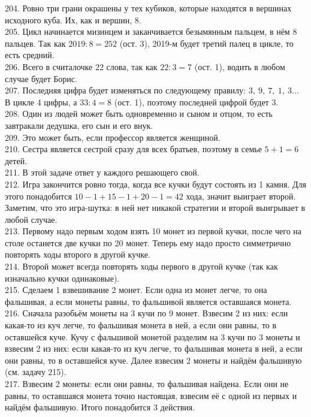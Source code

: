 \documentclass[12pt]{article}
\begin{document}
204. Ровно три грани окрашены у тех кубиков, которые находятся в вершинах исходного куба. Их, как и вершин, 8.\\
205. Цикл начинается мизинцем и заканчивается безымянным пальцем, в нём 8 пальцев. Так как $2019:8=252$ (ост. 3), 2019-м будет третий палец в цикле, то есть средний.\\
206. Всего в считалочке 22 слова, так как $22:3=7$ (ост. 1), водить в любом случае будет Борис.\\
207. Последняя цифра будет изменяться по следующему правилу: $3,\ 9,\ 7,\ 1,\ 3\ldots$ В цикле 4 цифры, а $33:4=8$ (ост. 1), поэтому последней цифрой будет 3.\\
208. Один из людей может быть одновременно и сыном и отцом, то есть завтракали дедушка, его сын и его внук.\\
209. Это может быть, если профессор является женщиной.\\
210. Сестра является сестрой сразу для всех братьев, поэтому в семье $5+1=6$ детей.\\
211. В этой задаче ответ у каждого решающего свой.\\
212. Игра закончится ровно тогда, когда все кучки будут состоять из 1 камня. Для этого понадобится $10-1+15-1+20-1=42$ хода, значит выиграет второй. Заметим, что это игра-шутка: в ней нет никакой стратегии и второй выигрывает в любой случае.\\
213. Первому надо первым ходом взять 10 монет из первой кучки, после чего на столе останется две кучки по 20 монет. Теперь ему надо просто симметрично повторять ходы второго в другой кучке.\\
214. Второй может всегда повторять ходы первого в другой кучке (так как изначально кучки одинаковые).\\
215. Сделаем 1 взвешивание 2 монет. Если одна из монет легче, то она фальшивая, а если монеты равны, то фальшивой является оставшаяся монета.\\
216. Сначала разобьём монеты на 3 кучи по 9 монет. Взвесим 2 из них: если какая-то из куч легче, то фальшивая монета в ней, а если они равны, то в оставшейся куче. Кучу с фальшивой монетой разделим на 3 кучи по 3 монеты и взвесим 2 из них:  если какая-то из куч легче, то фальшивая монета в ней, а если они равны, то в оставшейся куче. Далее взвесим 2 монеты и найдём фальшивую (см. задачу 215).\\
217. Взвесим 2 монеты: если они равны, то фальшивая найдена. Если они не равны, то оставшаяся монета точно настоящая, взвесим её с одной из первых и найдём фальшивую. Итого понадобится 3 действия.
\end{document}
